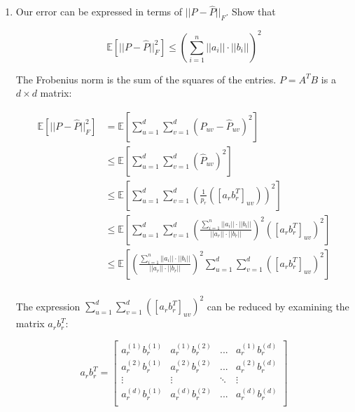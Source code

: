 \documentclass[11pt]{article}
\theoremstyle{definition}
\theoremstyle{case}
\theoremstyle{theorem}
\begin{document}
\begin{enumerate}[label=(\alph*)]

\item Our error can be expressed in terms of $||P - \hat{P}||_F$. Show that 

\[
  \mathbb{E}\left[ ||P - \hat{P}||_F^2 \right] \leq \left( \sum_{i=1}^n ||a_i|| \cdot ||b_i|| \right)^2
\]

The Frobenius norm is the sum of the squares of the entries. $P = A^T B$ is a $d \times d$ matrix:

\begin{align*}
  \mathbb{E}\left[ ||P - \hat{P}||_F^2 \right] &= \mathbb{E}\left[ \sum_{u=1}^{d} \sum_{v=1}^{d} (P_{uv} - \hat{P}_{uv})^2 \right] \\
                                               &\leq \mathbb{E}\left[ \sum_{u=1}^{d} \sum_{v=1}^{d} (\hat{P}_{uv})^2 \right] \\
                                               &\leq \mathbb{E}\left[ \sum_{u=1}^{d} \sum_{v=1}^{d} (\frac{1}{p_r} ([a_r b_r^T]_{uv}))^2 \right] \\
                                               &\leq \mathbb{E}\left[ \sum_{u=1}^{d} \sum_{v=1}^{d} \left( \frac{\sum_{i=1}^n ||a_i|| \cdot ||b_i||}{||a_r|| \cdot ||b_r||} \right)^2 ([a_r b_r^T]_{uv})^2 \right] \\
                                               &\leq \mathbb{E}\left[ \left( \frac{\sum_{i=1}^n ||a_i|| \cdot ||b_i||}{||a_r|| \cdot ||b_r||} \right)^2 \sum_{u=1}^{d} \sum_{v=1}^{d} ([a_r b_r^T]_{uv})^2 \right] \\
\end{align*}

The expression $\sum_{u=1}^{d} \sum_{v=1}^{d} ([a_r b_r^T]_{uv})^2$ can be reduced by examining the matrix $a_r b_r^T$:

\[
  a_r b_r^T = 
   \left[
     \begin{array}{cccc}
       a_r^{(1)} b_r^{(1)} & a_r^{(1)} b_r^{(2)} & ...    & a_r^{(1)} b_r^{(d)} \\
       a_r^{(2)} b_r^{(1)} & a_r^{(2)} b_r^{(2)} & ...    & a_r^{(2)} b_r^{(d)} \\
       \vdots              & \vdots              & \ddots & \vdots              \\
       a_r^{(d)} b_r^{(1)} & a_r^{(d)} b_r^{(2)} & ...    & a_r^{(d)} b_r^{(d)} \\
     \end{array}
   \right]
\]


\end{enumerate}
\end{document}

